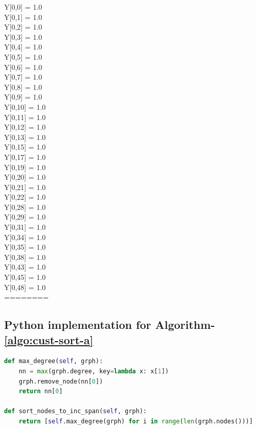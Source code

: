 \documentclass[11pt]{article}
\begin{document}
Y[0,0] = 1.0\\
Y[0,1] = 1.0\\
Y[0,2] = 1.0\\
Y[0,3] = 1.0\\
Y[0,4] = 1.0\\
Y[0,5] = 1.0\\
Y[0,6] = 1.0\\
Y[0,7] = 1.0\\
Y[0,8] = 1.0\\
Y[0,9] = 1.0\\
Y[0,10] = 1.0\\
Y[0,11] = 1.0\\
Y[0,12] = 1.0\\
Y[0,13] = 1.0\\
Y[0,15] = 1.0\\
Y[0,17] = 1.0\\
Y[0,19] = 1.0\\
Y[0,20] = 1.0\\
Y[0,21] = 1.0\\
Y[0,22] = 1.0\\
Y[0,28] = 1.0\\
Y[0,29] = 1.0\\
Y[0,31] = 1.0\\
Y[0,34] = 1.0\\
Y[0,35] = 1.0\\
Y[0,38] = 1.0\\
Y[0,43] = 1.0\\
Y[0,45] = 1.0\\
Y[0,48] = 1.0\\
========\\
\newpage

\subsection{Python implementation for Algorithm-\ref{algo:cust-sort-a} \label{s:algo-impl-a}}
\begin{lstlisting}[language=Python]
def max_degree(self, grph):
    nn = max(grph.degree, key=lambda x: x[1])
    grph.remove_node(nn[0])
    return nn[0]

def sort_nodes_to_inc_span(self, grph):
    return [self.max_degree(grph) for i in range(len(grph.nodes()))]
\end{lstlisting}
\end{document}
